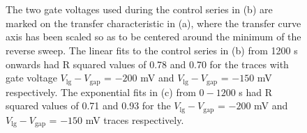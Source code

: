 \documentclass[
  a4paper,
]{scrbook}
\begin{document}
\begin{figure}
\begin{minipage}[t]{0.50\linewidth}
{{}

}

\subcaption{\label{fig-linear-fit}}
\end{minipage}%
\newline
\begin{minipage}[t]{0.25\linewidth}

{\centering 

~

}

\end{minipage}%
%
\begin{minipage}[t]{0.50\linewidth}

{\centering 


}

\subcaption{\label{fig-exp-fit}}
\end{minipage}%
%
\begin{minipage}[t]{0.25\linewidth}

{\centering 

~

}

\end{minipage}%

\caption{\label{fig-salt-conc-control-series-SU8}The two gate voltages
used during the control series in (b) are marked on the transfer
characteristic in (a), where the transfer curve axis has been scaled so
as to be centered around the minimum of the reverse sweep. The linear
fits to the control series in (b) from 1200 s onwards had R squared
values of 0.78 and 0.70 for the traces with gate voltage
\(V_{\textrm{lg}}-V_{\textrm{gap}}\) = \(-200\) mV and
\(V_{\textrm{lg}}-V_{\textrm{gap}}\) = \(-150\) mV respectively. The
exponential fits in (c) from \(0-1200\) s had R squared values of 0.71
and 0.93 for the \(V_{\textrm{lg}}-V_{\textrm{gap}}\) = \(-200\) mV and
\(V_{\textrm{lg}}-V_{\textrm{gap}}\) = \(-150\) mV traces respectively.}

\end{figure}
\end{document}
